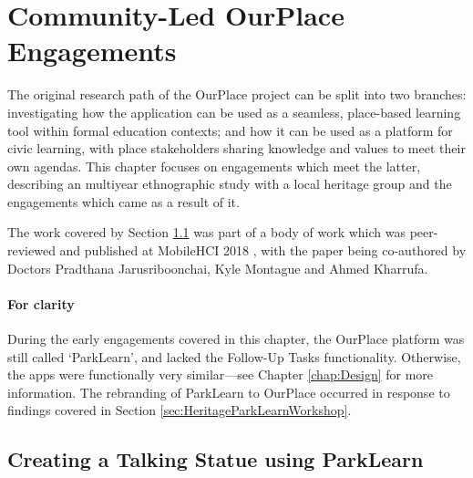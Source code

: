 \chapter{Community-Led OurPlace Engagements}
\label{chap:Community}

The original research path of the OurPlace project can be split into two branches: investigating how the application can be used as a seamless, place-based learning tool within formal education contexts; and how it can be used as a platform for civic learning, with place stakeholders sharing knowledge and values to meet their own agendas. This chapter focuses on engagements which meet the latter, describing an multiyear ethnographic study with a local heritage group and the engagements which came as a result of it. 

The work covered by Section \ref{sec:TalkingStatue} was part of a body of work which was peer-reviewed and published at MobileHCI 2018 \citep{Richardson2018}, with the paper being co-authored by Doctors Pradthana Jarusriboonchai, Kyle Montague and Ahmed Kharrufa.

\subsubsection{For clarity}
During the early engagements covered in this chapter, the OurPlace platform was still called `ParkLearn', and lacked the Follow-Up Tasks functionality. Otherwise, the apps were functionally very similar---see Chapter \ref{chap:Design} for more information. The rebranding of ParkLearn to OurPlace occurred in response to findings covered in Section \ref{sec:HeritageParkLearnWorkshop}.

\section{Creating a Talking Statue using ParkLearn}
\label{sec:TalkingStatue}

